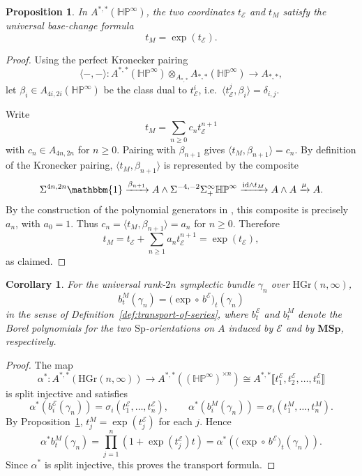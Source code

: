 \documentclass[a4paper]{amsart}
\theoremstyle{plain}
\newtheorem{proposition}[subsubsection]{Proposition}
\newtheorem{corollary}[subsubsection]{Corollary}
\theoremstyle{definition}
\newcommand{\Sp}{\mathrm{Sp}}
\newcommand{\MSp}{\mathbf{MSp}}
\newcommand{\E}{\mathcal{E}}
\newcommand{\HP}{\mathbb{HP}}
\newcommand{\HGr}{\mathrm{HGr}}
\newcommand{\HPinf}{\HP^{\infty}}
\renewcommand{\ge}{\geqslant}
\begin{document}
\begin{proposition}\label{prop:msp-universal-base-change}
	In $A^{*,*}(\HPinf)$, the two coordinates $t_{\E}$ and $t_M$ satisfy the universal base-change formula
	\[
		t_{M} = \exp(t_{\E}).
	\]
\end{proposition}
\begin{proof}
	Using the perfect Kronecker pairing \cite[Lemma~4.8]{bachmann2021eta}
	\[
		\langle-,-\rangle:A^{*,*}(\HPinf)\otimes_{A_{*,*}}A_{*,*}(\HPinf)\to A_{*,*},
	\]
	let $\beta_i \in A_{4i,2i}(\HPinf)$ be the class dual to $t_{\E}^i$, i.e.\ $\langle t_{\E}^j,\beta_i\rangle=\delta_{i,j}$.

	Write
	\[
		t_M=\sum_{n\ge 0} c_{n} t_{\E}^{n+1}
	\]
	with $c_n\in A_{4n,2n}$ for $n\ge 0$. Pairing with $\beta_{n+1}$ gives $\langle t_M,\beta_{n+1}\rangle=c_{n}$. By definition of the Kronecker pairing, $\langle t_M,\beta_{n+1}\rangle$ is represented by the composite
	\[
		\Sigma^{4n,2n} \mathbbm{1} \xrightarrow{\beta_{n+1}}
		A \wedge \Sigma^{-4,-2}\Sigma^{\infty}_{+}\HPinf
		\xrightarrow{\mathrm{id}\wedge t_M}
		A \wedge A
		\xrightarrow{\mu}
		A.
	\]
	By the construction of the polynomial generators in \cite[Theorem~4.1(1)]{bachmann2021eta}, this composite is precisely $a_{n}$, with $a_0=1$. Thus $c_n = \langle t_M,\beta_{n+1}\rangle=a_n$ for $n\ge 0$. Therefore
	\[
		t_M=t_{\E}+\sum_{n\ge 1} a_n t_{\E}^{n+1}=\exp(t_{\E}),
	\]
	as claimed.
\end{proof}

\begin{corollary}\label{coro:transport-base-change}
	For the universal rank-$2n$ symplectic bundle $\gamma_n$ over $\HGr(n,\infty)$,
	\[
		b_t^M(\gamma_n)=\bigl(\exp \circ\, b^\E\bigr)_t(\gamma_n)
	\]
	in the sense of Definition~\ref{def:transport-of-series}, where $b_t^\E$ and $b_t^M$ denote the Borel polynomials for the two $\Sp$-orientations on $A$ induced by $\E$ and by $\MSp$, respectively.
\end{corollary}
\begin{proof}
	The map
	\[
		\alpha^{*}:A^{*,*}(\HGr(n,\infty)) \to A^{*,*}((\HPinf)^{\times n}) \cong A^{*,*} \llbracket t^{\E}_1, t^{\E}_2, \ldots, t^{\E}_n \rrbracket
	\]
	is split injective and satisfies
	\[
		\alpha^*(b^{\E}_i(\gamma_n))=\sigma_i(t^{\E}_1,\ldots,t^{\E}_n),\qquad
		\alpha^*(b^{M}_i(\gamma_n))=\sigma_i(t^{M}_1,\ldots,t^{M}_n).
	\]
	By Proposition~\ref{prop:msp-universal-base-change}, $t^M_j=\exp(t^\E_j)$ for each $j$. Hence
	\[
		\alpha^*b_t^M(\gamma_n)
		=\prod_{j=1}^{n}\left(1+\exp(t_j^\E)t\right)
		=\alpha^*\left(\bigl(\exp \circ\, b^\E\bigr)_t(\gamma_n)\right).
	\]
	Since $\alpha^*$ is split injective, this proves the transport formula.
\end{proof}
\end{document}
